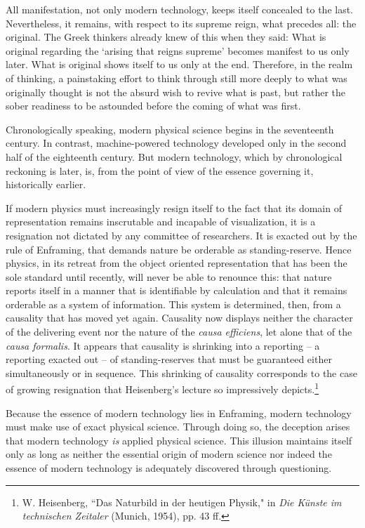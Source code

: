 \documentclass[paper=a4, fontsize=11pt,twoside]{scrartcl}
\begin{document}
All manifestation, not only modern technology, keeps itself concealed to the last. Nevertheless, it remains, with respect to its supreme reign, what precedes all: the original. The Greek thinkers already knew of this when they said: What is original regarding the `arising that reigns supreme' becomes manifest to us only later. What is original shows itself to us only at the end. Therefore, in the realm of thinking, a painstaking effort to think through still more deeply to what was originally thought is not the absurd wish to revive what is past, but rather the sober readiness to be astounded before the coming of what was first.

Chronologically speaking, modern physical science begins in the seventeenth century. In contrast, machine-powered technology developed only in the second half of the eighteenth century. But modern technology, which by chronological reckoning is later, is, from the point of view of the essence governing it, historically earlier.

If modern physics must increasingly resign itself to the fact that its domain of representation remains inscrutable and incapable of visualization, it is a resignation not dictated by any committee of researchers. It is exacted out by the rule of Enframing, that demands nature be orderable as standing-reserve. Hence physics, in its retreat from the object oriented representation that has been the sole standard until recently, will never be able to renounce this: that nature reports itself in a manner that is identifiable by calculation and that it remains orderable as a system of information. This system is determined, then, from a causality that has moved yet again. Causality now displays neither the character of the delivering event nor the nature of the \textit{causa efficiens}, let alone that of the \textit{causa formalis}. It appears that causality is shrinking into a reporting -- a reporting exacted out -- of standing-reserves that must be guaranteed either simultaneously or in sequence.  This shrinking of causality corresponds to the case of growing resignation that Heisenberg's lecture so impressively depicts.\footnote[1]{W. Heisenberg, ``Das Naturbild in der heutigen Physik," in \textit{Die K{\"u}nste im technischen Zeitaler} (Munich, 1954), pp. 43 ff.}

Because the essence of modern technology lies in Enframing, modern technology must make use of exact physical science. Through doing so, the deception arises that modern technology \textit{is} applied physical science. This illusion maintains itself only as long as neither the essential origin of modern science nor indeed the essence of modern technology is adequately discovered through questioning.
\end{document}

